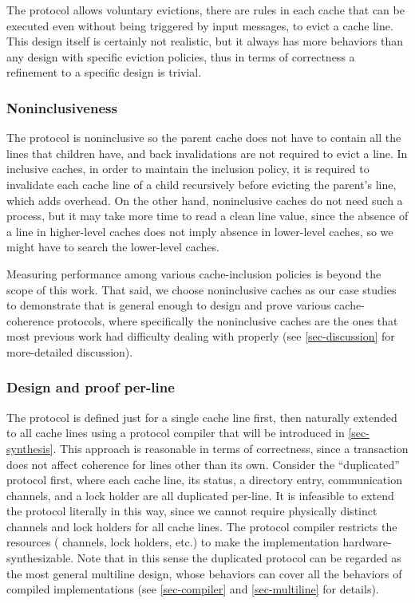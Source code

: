 \documentclass[sigplan,10pt,review,anonymous,screen]{acmart}\settopmatter{printfolios=true,printccs=false,printacmref=false}
\begin{document}
The protocol allows voluntary evictions, \ie{} there are rules in each cache that can be executed even without being triggered by input messages, to evict a cache line.
This design itself is certainly not realistic, but it always has more behaviors than any design with specific eviction policies, thus in terms of correctness a refinement to a specific design is trivial.

\subsubsection{Noninclusiveness}

The protocol is noninclusive so the parent cache does not have to contain all the lines that children have, and back invalidations are not required to evict a line.
In inclusive caches, in order to maintain the inclusion policy, it is required to invalidate each cache line of a child recursively before evicting the parent's line, which adds overhead.
On the other hand, noninclusive caches do not need such a process, but it may take more time to read a clean line value, since the absence of a line in higher-level caches does not imply absence in lower-level caches, so we might have to search the lower-level caches.

Measuring performance among various cache-inclusion policies is beyond the scope of this work.
That said, we choose noninclusive caches as our case studies to demonstrate that \hemiola{} is general enough to design and prove various cache-coherence protocols, where specifically the noninclusive caches are the ones that most previous work had difficulty dealing with properly (see \autoref{sec-discussion} for more-detailed discussion).

\subsubsection{Design and proof per-line}
\label{sec-design-line}

The protocol is defined just for a single cache line first, then naturally extended to all cache lines using a protocol compiler that will be introduced in \autoref{sec-synthesis}.
This approach is reasonable in terms of correctness, since a transaction does not affect coherence for lines other than its own.
Consider the ``duplicated'' protocol first, where each cache line, its status, a directory entry, communication channels, and a lock holder are all duplicated per-line.
It is infeasible to extend the protocol literally in this way, since we cannot require physically distinct channels and lock holders for all cache lines.
The protocol compiler restricts the resources (\eg{} channels, lock holders, etc.) to make the implementation hardware-synthesizable.
Note that in this sense the duplicated protocol can be regarded as the most general multiline design, whose behaviors can cover all the behaviors of compiled implementations (see \autoref{sec-compiler} and \autoref{sec-multiline} for details).
\end{document}

